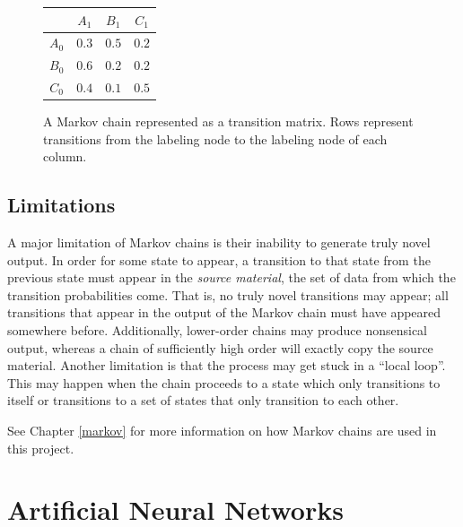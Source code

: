 \begin{figure}[h]
	\centering
	\begin{tabular}{c | c c c}
		& $A_{1}$ & $B_{1}$ & $C_{1}$\\
		\hline
		$A_{0}$ & $0.3$ & $0.5$ & $0.2$\\
		$B_{0}$ & $0.6$ & $0.2$ & $0.2$\\
		$C_{0}$ & $0.4$ & $0.1$ & $0.5$
	\end{tabular}
	\caption[A Markov chain represented as a transition matrix.]{A Markov chain represented as a transition matrix. Rows represent transitions from the labeling node to the labeling node of each column.}
	\label{fig:markovMatrix}
\end{figure}

\subsection{Limitations} \label{bg:markov:limitations}

A major limitation of Markov chains is their inability to generate truly novel output.
In order for some state to appear, a transition to that state from the previous state must appear in the \textit{source material}, the set of data from which the transition probabilities come.
That is, no truly novel transitions may appear; all transitions that appear in the output of the Markov chain must have appeared somewhere before.
Additionally, lower-order chains may produce nonsensical output, whereas a chain of sufficiently high order will exactly copy the source material.
Another limitation is that the process may get stuck in a ``local loop''.
This may happen when the chain proceeds to a state which only transitions to itself or transitions to a set of states that only transition to each other.

See Chapter \ref{markov} for more information on how Markov chains are used in this project.

\section{Artificial Neural Networks} \label{bg:nn}

